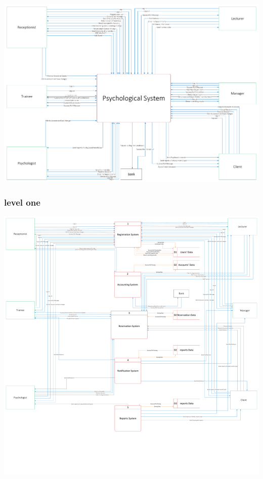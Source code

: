 \documentclass[../Psychological_system_web_application.tex]{subfiles}
\begin{document}
						\includegraphics[width=\textwidth ,height=0.9\textheight ,scale=4]{Diagrams/Data-Flow_Context.pdf}
						\label{FIG:2.02}
					
					
				\subsubsection{level one}
					
						\includegraphics[width=\textwidth ,height=0.9\textheight ,scale=4]{Diagrams/Data-Flow_level0.pdf}
						\label{FIG:2.03}
					
\end{document}

